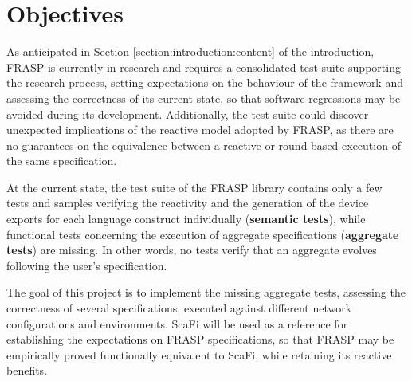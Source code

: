 
\section{Objectives}
\label{section:analysis:objectives}

As anticipated in Section \ref{section:introduction:content} of the
introduction, FRASP is currently in research and requires a consolidated test
suite supporting the research process, setting expectations on the behaviour of
the framework and assessing the correctness of its current state, so that
software regressions may be avoided during its development. Additionally, the
test suite could discover unexpected implications of the reactive model adopted
by FRASP, as there are no guarantees on the equivalence between a reactive or
round-based execution of the same specification.

At the current state, the test suite of the FRASP library contains only a few
tests and samples verifying the reactivity and the generation of the device
exports for each language construct individually (\textbf{semantic tests}),
while functional tests concerning the execution of aggregate specifications
(\textbf{aggregate tests}) are missing. In other words, no tests verify that an
aggregate evolves following the user's specification.

The goal of this project is to implement the missing aggregate tests, assessing
the correctness of several specifications, executed against different network
configurations and environments. \ac{ScaFi} will be used as a reference for
establishing the expectations on FRASP specifications, so that FRASP may be
empirically proved functionally equivalent to \ac{ScaFi}, while retaining its
reactive benefits.
